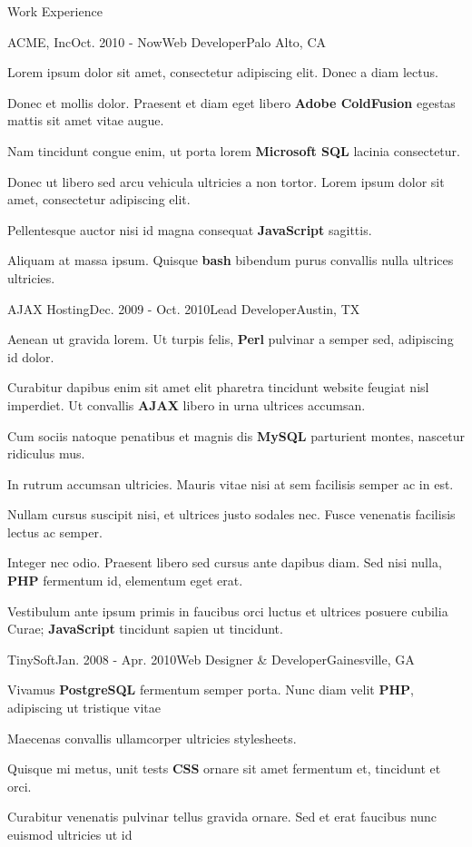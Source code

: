\documentclass{resume}
\begin{document}
    \begin{rSection}{Work Experience}
  \begin{rSubsection}{ACME, Inc}{Oct. 2010 - Now}{Web Developer}{Palo Alto, CA}
    \item Lorem ipsum dolor sit amet, consectetur adipiscing elit. Donec a diam lectus.
    \item Donec et mollis dolor. Praesent et diam eget libero \textbf{Adobe ColdFusion} egestas mattis sit amet vitae augue.
    \item Nam tincidunt congue enim, ut porta lorem \textbf{Microsoft SQL} lacinia consectetur.
    \item Donec ut libero sed arcu vehicula ultricies a non tortor. Lorem ipsum dolor sit amet, consectetur adipiscing elit.
    \item Pellentesque auctor nisi id magna consequat \textbf{JavaScript} sagittis.
    \item Aliquam at massa ipsum. Quisque \textbf{bash} bibendum purus convallis nulla ultrices ultricies.
  \end{rSubsection}


  \begin{rSubsection}{AJAX Hosting}{Dec. 2009 - Oct. 2010}{Lead Developer}{Austin, TX}
    \item Aenean ut gravida lorem. Ut turpis felis, \textbf{Perl} pulvinar a semper sed, adipiscing id dolor.
    \item Curabitur dapibus enim sit amet elit pharetra tincidunt website feugiat nisl imperdiet. Ut convallis \textbf{AJAX} libero in urna ultrices accumsan.
    \item Cum sociis natoque penatibus et magnis dis \textbf{MySQL} parturient montes, nascetur ridiculus mus.
    \item In rutrum accumsan ultricies. Mauris vitae nisi at sem facilisis semper ac in est.
    \item Nullam cursus suscipit nisi, et ultrices justo sodales nec. Fusce venenatis facilisis lectus ac semper.
    \item Integer nec odio. Praesent libero sed cursus ante dapibus diam. Sed nisi nulla, \textbf{PHP} fermentum id, elementum eget erat.
    \item Vestibulum ante ipsum primis in faucibus orci luctus et ultrices posuere cubilia Curae; \textbf{JavaScript} tincidunt sapien ut tincidunt.
  \end{rSubsection}

  \begin{rSubsection}{TinySoft}{Jan. 2008 - Apr. 2010}{Web Designer \& Developer}{Gainesville, GA}
    \item Vivamus \textbf{PostgreSQL} fermentum semper porta. Nunc diam velit \textbf{PHP}, adipiscing ut tristique vitae
    \item Maecenas convallis ullamcorper ultricies stylesheets.
    \item Quisque mi metus, unit tests \textbf{CSS} ornare sit amet fermentum et, tincidunt et orci.
    \item Curabitur venenatis pulvinar tellus gravida ornare. Sed et erat faucibus nunc euismod ultricies ut id
  \end{rSubsection}


\end{rSection}
\end{document}
